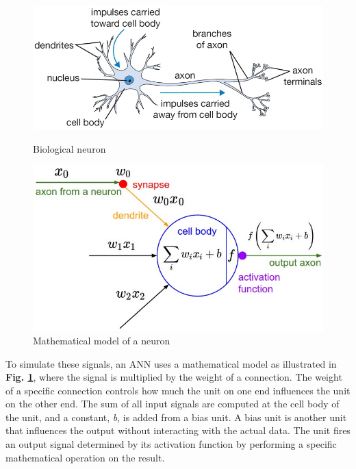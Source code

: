 \begin{figure}
    \begin{minipage}{0.5\textwidth}
        \centering
            \includegraphics[width=1\textwidth]{fig/neuron}
            \caption{Biological neuron\cite{cs231n_part1}}
            \label{fig1}
    \end{minipage}
    \begin{minipage}{0.4\textwidth}
        \centering
            \includegraphics[width=1\textwidth]{fig/neuron_model}
            \caption{Mathematical model of a neuron\cite{cs231n_part1}}
            \label{fig2}
    \end{minipage}
\end{figure}

\noindent To simulate these signals, an ANN uses a mathematical model as illustrated in \textbf{Fig. \ref{fig2}}, where the signal is multiplied by the weight of a connection. The weight of a specific connection controls how much the unit on one end influences the unit on the other end. The sum of all input signals are computed at the cell body of the unit, and a constant, \textit{b}, is added from a bias unit. A bias unit is another unit that influences the output without interacting with the actual data. The unit fires an output signal determined by its activation function by performing a specific mathematical operation on the result.

